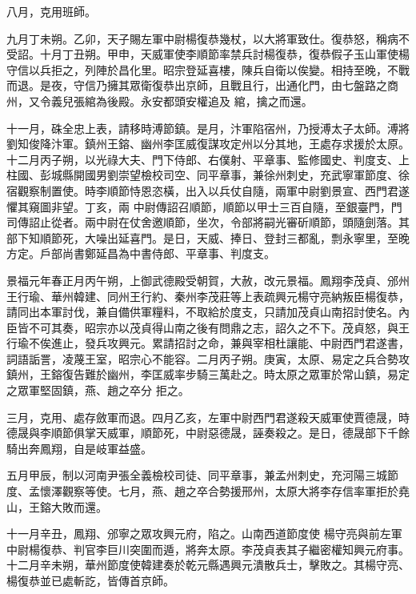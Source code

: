 \begin{pinyinscope}
 八月，克用班師。



 九月丁未朔。乙卯，天子賜左軍中尉楊復恭幾杖，以大將軍致仕。復恭怒，稱病不受詔。十月丁丑朔。甲申，天威軍使李順節率禁兵討楊復恭，復恭假子玉山軍使楊守信以兵拒之，列陣於昌化里。昭宗登延喜樓，陳兵自衛以俟變。相持至晚，不戰而退。是夜，守信乃擁其眾衛復恭出京師，且戰且行，出通化門，由七盤路之商州，又令義兒張綰為後殿。永安都頭安權追及
 綰，擒之而還。



 十一月，硃全忠上表，請移時溥節鎮。是月，汴軍陷宿州，乃授溥太子太師。溥將劉知俊降汴軍。鎮州王鎔、幽州李匡威復謀攻定州以分其地，王處存求援於太原。十二月丙子朔，以光祿大夫、門下侍郎、右僕射、平章事、監修國史、判度支、上柱國、彭城縣開國男劉崇望檢校司空、同平章事，兼徐州刺史，充武寧軍節度、徐宿觀察制置使。時李順節恃恩恣橫，出入以兵仗自隨，兩軍中尉劉景宣、西門君遂懼其窺圖非望。丁亥，兩
 中尉傳詔召順節，順節以甲士三百自隨，至銀臺門，門司傳詔止從者。兩中尉在仗舍邀順節，坐次，令部將嗣光審斫順節，頭隨劍落。其部下知順節死，大噪出延喜門。是日，天威、捧日、登封三都亂，剽永寧里，至晚方定。戶部尚書鄭延昌為中書侍郎、平章事、判度支。



 景福元年春正月丙午朔，上御武德殿受朝賀，大赦，改元景福。鳳翔李茂貞、邠州王行瑜、華州韓建、同州王行約、秦州李茂莊等上表疏興元楊守亮納叛臣楊復恭，
 請同出本軍討伐，兼自備供軍糧料，不取給於度支，只請加茂貞山南招討使名。內臣皆不可其奏，昭宗亦以茂貞得山南之後有問鼎之志，詔久之不下。茂貞怒，與王行瑜不俟進止，發兵攻興元。累請招討之命，兼與宰相杜讓能、中尉西門君遂書，詞語詬詈，凌蔑王室，昭宗心不能容。二月丙子朔。庚寅，太原、易定之兵合勢攻鎮州，王鎔復告難於幽州，李匡威率步騎三萬赴之。時太原之眾軍於常山鎮，易定之眾軍堅固鎮，燕、趙之卒分
 拒之。



 三月，克用、處存斂軍而退。四月乙亥，左軍中尉西門君遂殺天威軍使賈德晟，時德晟與李順節俱掌天威軍，順節死，中尉惡德晟，誣奏殺之。是日，德晟部下千餘騎出奔鳳翔，自是岐軍益盛。



 五月甲辰，制以河南尹張全義檢校司徒、同平章事，兼孟州刺史，充河陽三城節度、孟懷澤觀察等使。七月，燕、趙之卒合勢援邢州，太原大將李存信率軍拒於堯山，王鎔大敗而還。



 十一月辛丑，鳳翔、邠寧之眾攻興元府，陷之。山南西道節度使
 楊守亮與前左軍中尉楊復恭、判官李巨川突圍而遁，將奔太原。李茂貞表其子繼密權知興元府事。十二月辛未朔，華州節度使韓建奏於乾元縣遇興元潰散兵士，擊敗之。其楊守亮、楊復恭並已處斬訖，皆傳首京師。




\end{pinyinscope}
